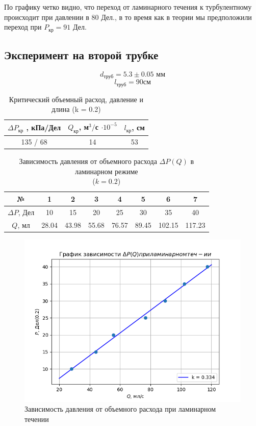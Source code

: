 По графику четко видно, что переход от ламинарного течения к турбулентному 
происходит при давлении в 80 Дел., в то время как в теории мы предположили
переход при $P_{\text{кр}} = 91$ Дел. 


\subsection*{Эксперимент на второй трубке}
$$d_{\text{труб}} = 5.3 \pm 0.05 \text{ мм}$$
$$l_{\text{труб}} = 90 \text{см}$$
\begin{table}[h]
    \centering
    \begin{tabular}{|c|c|c|}
        \hline
        $\Delta P_{\text{кр}}$ , кПа/Дел& $Q_{\text{кр}}$, м$^3/$с $\cdot 10^{-5}$ & $l_{\text{кр}}$, см \\\hline
        135 / 68 & 14 & 53\\\hline
    \end{tabular}
    \caption{Критический объемный расход, давление и длина (k = 0.2)}
\end{table}


\begin{table}[h!]
    \centering
    \begin{tabular}{|c|c|c|c|c|c|c|c|}
        \hline
        №  & 1 & 2 & 3 & 4 & 5 & 6 & 7\\\hline 
        $\Delta P$, Дел & 10 & 15 & 20 & 25 & 30 & 35 & 40\\\hline 
        $Q$, мл & 28.04 & 43.98 & 55.68 & 76.57 & 89.45 & 102.15 & 117.23\\\hline 
    \end{tabular}
    \caption{Зависимость давления от объемного расхода $\Delta P(Q)$ 
    в ламинарном режиме\\ ($k = 0.2$)}
\end{table}

\begin{figure}[h!]
    \centering
    \includegraphics[width=12cm]{plot3.png}
    \caption{Зависимость давления от объемного расхода 
    при ламинарном течении}
    \label{fig:plot3}
\end{figure}

